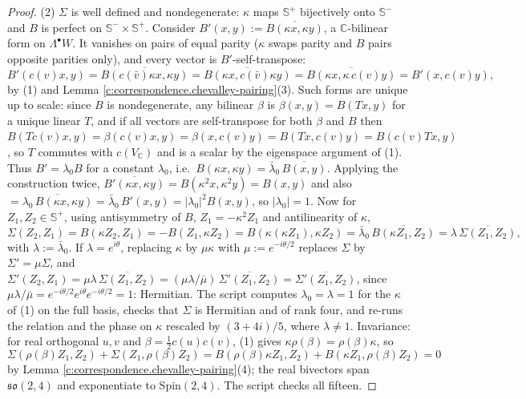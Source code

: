 \documentclass[11pt]{article}
\theoremstyle{definition}
\theoremstyle{plain}
\providecommand{\C}{}\renewcommand{\C}{\mathbb{C}}
\providecommand{\CS}{}\renewcommand{\CS}{{\mathbb{S}^{+}}}
\providecommand{\CSm}{}\renewcommand{\CSm}{{\mathbb{S}^{-}}}
\begin{document}
\begin{proof}
(2) $\Sigma$ is well defined and nondegenerate: $\kappa$ maps $\CS$ bijectively onto $\CSm$ and $B$ is perfect on $\CSm\times\CS$. Consider $B'(x, y) := \overline{B(\kappa x, \kappa y)}$, a $\C$-bilinear form on $\Lambda^\bullet W$. It vanishes on pairs of equal parity ($\kappa$ swaps parity and $B$ pairs opposite parities only), and every vector is $B'$-self-transpose:
\[
B'(c(v)x, y) = \overline{B(c(\bar v)\kappa x, \kappa y)} = \overline{B(\kappa x, c(\bar v)\kappa y)} = \overline{B(\kappa x, \kappa\, c(v) y)} = B'(x, c(v) y),
\]
by (1) and Lemma \ref{c:correspondence.chevalley-pairing}(3). Such forms are unique up to scale: since $B$ is nondegenerate, any bilinear $\beta$ is $\beta(x,y) = B(Tx, y)$ for a unique linear $T$, and if all vectors are self-transpose for both $\beta$ and $B$ then $B(Tc(v)x, y) = \beta(c(v)x, y) = \beta(x, c(v)y) = B(Tx, c(v)y) = B(c(v)Tx, y)$, so $T$ commutes with $c(V_\C)$ and is a scalar by the eigenspace argument of (1). Thus $B' = \lambda_0 B$ for a constant $\lambda_0$, i.e.\ $B(\kappa x, \kappa y) = \bar\lambda_0\,\overline{B(x,y)}$. Applying the construction twice, $\overline{B'(\kappa x, \kappa y)} = B(\kappa^2 x, \kappa^2 y) = B(x, y)$ and also $= \overline{\lambda_0\,B(\kappa x, \kappa y)} = \bar\lambda_0\, B'(x,y) = |\lambda_0|^2 B(x,y)$, so $|\lambda_0| = 1$. Now for $Z_1, Z_2 \in \CS$, using antisymmetry of $B$, $Z_1 = -\kappa^2 Z_1$ and antilinearity of $\kappa$,
\[
\Sigma(Z_2, Z_1) = B(\kappa Z_2, Z_1) = -B(Z_1, \kappa Z_2) = B(\kappa(\kappa Z_1), \kappa Z_2) = \bar\lambda_0\,\overline{B(\kappa Z_1, Z_2)} = \lambda\,\overline{\Sigma(Z_1, Z_2)},
\]
with $\lambda := \bar\lambda_0$.
If $\lambda = e^{i\theta}$, replacing $\kappa$ by $\mu\kappa$ with $\mu := e^{-i\theta/2}$ replaces $\Sigma$ by $\Sigma' = \mu\Sigma$, and $\Sigma'(Z_2,Z_1) = \mu\lambda\,\overline{\Sigma(Z_1,Z_2)} = (\mu\lambda/\bar\mu)\,\overline{\Sigma'(Z_1,Z_2)} = \overline{\Sigma'(Z_1,Z_2)}$, since $\mu\lambda/\bar\mu = e^{-i\theta/2}e^{i\theta}e^{-i\theta/2} = 1$: Hermitian. The script computes $\lambda_0 = \lambda = 1$ for the $\kappa$ of (1) on the full basis, checks that $\Sigma$ is Hermitian and of rank four, and re-runs the relation and the phase on $\kappa$ rescaled by $(3+4i)/5$, where $\lambda \neq 1$. Invariance: for real orthogonal $u, v$ and $\beta = \tfrac12 c(u)c(v)$, (1) gives $\kappa\rho(\beta) = \rho(\beta)\kappa$, so
\[
\Sigma(\rho(\beta)Z_1, Z_2) + \Sigma(Z_1, \rho(\beta)Z_2) = B(\rho(\beta)\kappa Z_1, Z_2) + B(\kappa Z_1, \rho(\beta) Z_2) = 0
\]
by Lemma \ref{c:correspondence.chevalley-pairing}(4); the real bivectors span $\mathfrak{so}(2,4)$ and exponentiate to $\mathrm{Spin}(2,4)$. The script checks all fifteen.


\end{proof}
\end{document}
